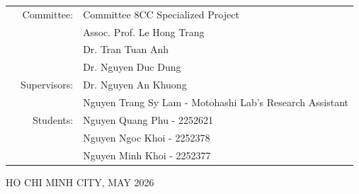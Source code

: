 \documentclass[openany]{mitthesis}
\theoremstyle{definition}
\begin{document}
\begin{titlepage}
\vspace{0.1cm}

\begin{table}[h]
\begin{tabular}{rrl}
  
\hspace{4 cm} & Committee: & Committee 8CC Specialized Project \\
& & Assoc. Prof. Le Hong Trang \\
& & Dr. Tran Tuan Anh \\
& & Dr. Nguyen Duc Dung \\[0.3cm]
& Supervisors: & Dr. Nguyen An Khuong \\
& & Nguyen Trang Sy Lam - Motohashi Lab's Research Assistant \\[0.3cm]
& Students: & Nguyen Quang Phu - 2252621 \\
& & Nguyen Ngoc Khoi - 2252378 \\
& & Nguyen Minh Khoi - 2252377 \\
\end{tabular}
\end{table}

\vfill
\begin{center}
{\footnotesize HO CHI MINH CITY, MAY 2026}
\end{center}
\restoregeometry
\end{titlepage}

\tableofcontents
\listoffigures
\listoftables

\pgfplotsset{compat=1.18}












\printbibliography[title=References]

\end{document}
